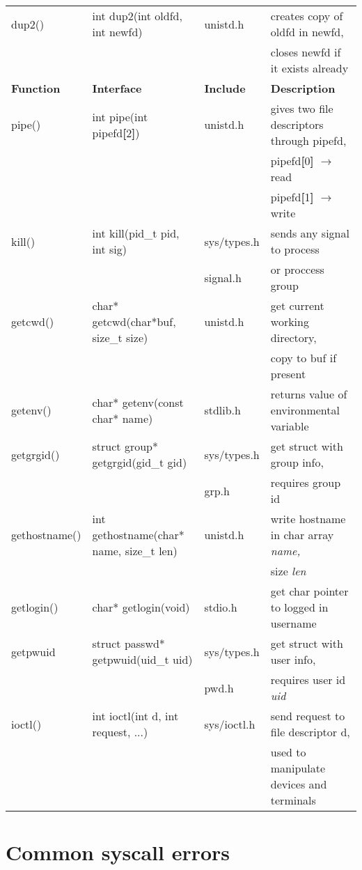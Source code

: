 \documentclass{article}
\begin{document}
\begin{longtable}{llll}
    \\ \hline
    dup2() & int dup2(int oldfd, int newfd) & unistd.h & creates copy of oldfd in newfd, 
    \\
    & & &closes newfd if it exists already 
    \\ \pagebreak
    \bf Function & \bf Interface & \bf Include & \bf Description
    \\ \hline
    pipe() & int pipe(int pipefd\textbf{[}2\textbf{]}) & unistd.h & gives two file descriptors through pipefd,
    \\
    & & & pipefd\textbf{[}0\textbf{]} $\rightarrow$ read
    \\
    & & & pipefd\textbf{[}1\textbf{]} $\rightarrow$ write
    \\ \hline
    kill() & int kill(pid\_t pid, int sig) & sys/types.h & sends any signal to process
    \\
    & & signal.h & or proccess group
    \\ \hline
    getcwd() & char* getcwd(char*buf, size\_t size)& unistd.h & get current working directory,
    \\
    & & & copy to buf if present
    \\ \hline
    getenv() & char* getenv(const char* name) & stdlib.h & returns value of environmental variable
    \\ \hline
    getgrgid() & struct group* getgrgid(gid\_t gid) & sys/types.h & get struct with group info,
    \\
    & &grp.h  &requires group id
    \\ \hline
    gethostname() & int gethostname(char* name, size\_t len) & unistd.h & write hostname in char array \it name\rm, 
    \\
    & & & size \it len\rm
    \\ \hline
    getlogin() & char* getlogin(void) & stdio.h & get char pointer to logged in username
    \\ \hline
    getpwuid & struct passwd* getpwuid(uid\_t uid) & sys/types.h & get struct with user info,
    \\
    & & pwd.h &requires user id \it uid \rm
    \\ \hline
    ioctl() & int ioctl(int d, int request, ...) & sys/ioctl.h & send request to file descriptor d,
    \\
    & & & used to manipulate devices and terminals
    
    
    
    
\end{longtable}

\section{Common syscall errors}
\large \rm
\end{document}
